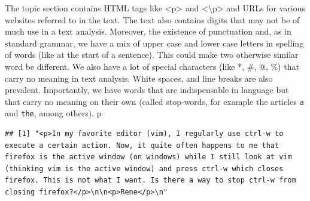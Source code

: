 \documentclass[
]{article}
\begin{document}
The topic section contains HTML tags like \textless p\textgreater{} and
\textless\textbackslash p\textgreater{} and URLs for various websites
referred to in the text. The text also contains digits that may not be
of much use in a text analysis. Moreover, the existence of punctuation
and, as in standard grammar, we have a mix of upper case and lower case
letters in spelling of words (like at the start of a sentence). This
could make two otherwise similar word be different. We also have a lot
of special characters (like *, \#, @, \%) that carry no meaning in text
analysis. White spaces, and line breaks are also prevalent. Importantly,
we have words that are indispensable in language but that carry no
meaning on their own (called stop-words, for example the articles
\texttt{a} and \texttt{the}, among others). p

\begin{verbatim}
## [1] "<p>In my favorite editor (vim), I regularly use ctrl-w to execute a certain action. Now, it quite often happens to me that firefox is the active window (on windows) while I still look at vim (thinking vim is the active window) and press ctrl-w which closes firefox. This is not what I want. Is there a way to stop ctrl-w from closing firefox?</p>\n\n<p>Rene</p>\n"                                                                                                                                                                                                                                                                                                                                                                                                                                                                                                                                                                                                                                                                                                                                                                                                                                                                                                                                                                                                                                                                                                                                                                                                                                                                                             

\end{verbatim}
\end{document}
